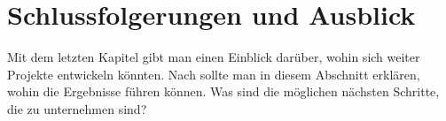 

\chapter{Schlussfolgerungen und Ausblick}

Mit dem letzten Kapitel gibt man einen Einblick darüber, wohin sich weiter Projekte entwickeln könnten. Nach \textcite{akajb2011} sollte man in diesem Abschnitt erklären, wohin die Ergebnisse führen können. Was sind die möglichen nächsten Schritte, die zu unternehmen sind?

